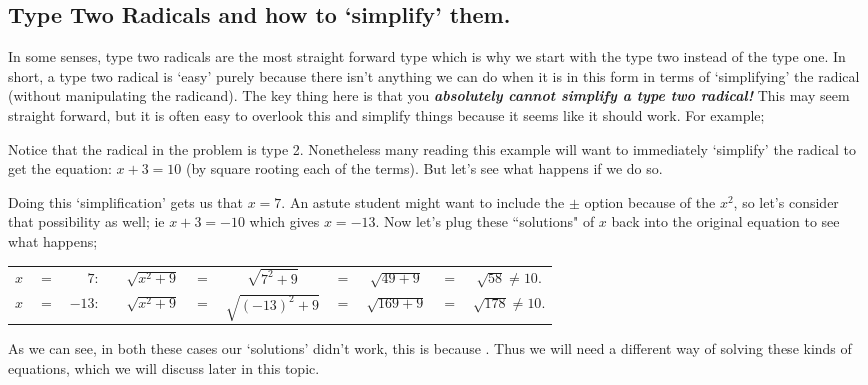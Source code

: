 \documentclass{ximeraXloud}
\begin{document}
\subsection*{Type Two Radicals and how to `simplify' them.}

    In some senses, type two radicals are the most straight forward type which is why we start with the type two instead of the type one. In short, a type two radical is `easy' purely because there isn't anything we can do when it is in this form in terms of `simplifying' the radical (without manipulating the radicand). The key thing here is that you \textit{\textbf{absolutely cannot simplify a type two radical!}} This may seem straight forward, but it is often easy to overlook this and simplify things because it seems like it should work. For example;

    \begin{example}[Find values of $x$ so that $\sqrt{x^2 + 9} = 10$]%
        Notice that the radical in the problem is type 2. Nonetheless many reading this example will want to immediately `simplify' the radical to get the equation: $x + 3 = 10$ (by square rooting each of the terms). But let's see what happens if we do so.

        Doing this `simplification' gets us that $x = 7$. An astute student might want to include the $\pm$ option because of the $x^2$, so let's consider that possibility as well; ie $x + 3 = - 10$ which gives $x = -13$. Now let's plug these ``solutions" of $x$ back into the original equation to see what happens;
        
        \begin{tabular}{lcrcccccccc}
            $x$ & $=$   & $7$:      & \hspace{1cm}  & $\sqrt{x^2 + 9}$ & $=$ & $\sqrt{7^2 + 9}$     & $=$ & $\sqrt{49 + 9}$     & $=$ & $\sqrt{58} \neq 10$.\\
            $x$ &  $=$  & $-13$:    &               & $\sqrt{x^2 + 9}$ & $=$ & $\sqrt{(-13)^2 + 9}$ & $=$ & $\sqrt{169 + 9}$    & $=$ & $\sqrt{178} \neq 10$.
        \end{tabular}

        As we can see, in both these cases our `solutions' didn't work, this is because . Thus we will need a different way of solving these kinds of equations, which we will discuss later in this topic.
    \end{example}%
\end{document}
